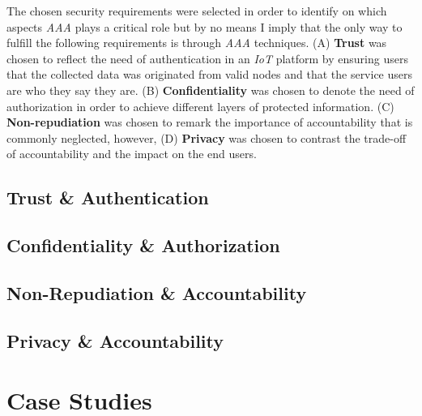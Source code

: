 \documentclass[journal]{IEEEtran}
\begin{document}
  The chosen security requirements were selected in order to identify on which aspects \emph{AAA} plays a critical role but by no means I imply that the only way to fulfill the following requirements is through \emph{AAA} techniques. (A) \textbf{Trust} was chosen to reflect the need of authentication in an \emph{IoT} platform by ensuring users that the collected data was originated from valid nodes and that the service users are who they say they are. (B) \textbf{Confidentiality} was chosen to denote the need of authorization in order to achieve different layers of protected information. (C) \textbf{Non-repudiation} was chosen to remark the importance of accountability that is commonly neglected, however, (D) \textbf{Privacy} was chosen to contrast the trade-off of accountability and the impact on the end users.

  \subsection{Trust \& Authentication}
  \blindtext

  \subsection{Confidentiality \& Authorization}
  \blindtext

  \subsection{Non-Repudiation \& Accountability}
  \blindtext

  \subsection{Privacy \& Accountability}
  \blindtext

\section{Case Studies}
\end{document}
